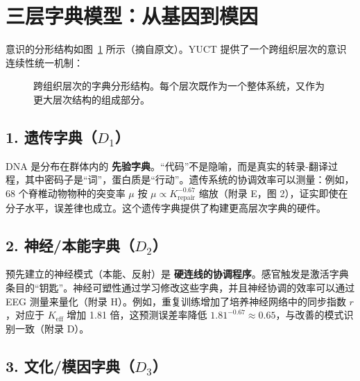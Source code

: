 \documentclass[12pt,a4paper]{article}
\newcommand{\eff}{\mathrm{eff}}
\newcommand{\Ke}{K_{\eff}}
\begin{document}
	\section{三层字典模型：从基因到模因}
	
	意识的分形结构如图~\ref{fig:fractal_dict} 所示（摘自原文）。YUCT 提供了一个跨组织层次的意识连续性统一机制：
	
	\begin{figure}[htbp]
		\centering
		\caption{跨组织层次的字典分形结构。每个层次既作为一个整体系统，又作为更大层次结构的组成部分。}
		\label{fig:fractal_dict}
	\end{figure}
	
	\subsection{1. 遗传字典（$D_1$）}
	
	DNA 是分布在群体内的 \textbf{先验字典}。“代码”不是隐喻，而是真实的转录-翻译过程，其中密码子是“词”，蛋白质是“行动”。遗传系统的协调效率可以测量：例如，68 个脊椎动物物种的突变率 $\mu$ 按 $\mu \propto K_{\text{repair}}^{-0.67}$ 缩放（附录 E，图 2），证实即使在分子水平，误差律也成立。这个遗传字典提供了构建更高层次字典的硬件。
	
	\subsection{2. 神经/本能字典（$D_2$）}
	
	预先建立的神经模式（本能、反射）是 \textbf{硬连线的协调程序}。感官触发是激活字典条目的“钥匙”。神经可塑性通过学习修改这些字典，并且神经协调的效率可以通过 EEG 测量来量化（附录 H）。例如，重复训练增加了培养神经网络中的同步指数 $r$，对应于 $\Ke$ 增加 1.81 倍，这预测误差率降低 $1.81^{-0.67} \approx 0.65$，与改善的模式识别一致（附录 D）。
	
	\subsection{3. 文化/模因字典（$D_3$）}
	
\end{document}
